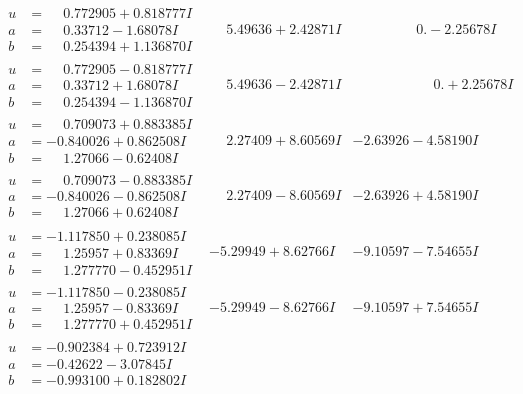 \documentclass[1p]{elsarticle_modified}
\theoremstyle{definition}
\begin{document}
$$\begin{array}{c|c|c}
\begin{aligned}
u &= \phantom{-}0.772905 + 0.818777 I \\
a &= \phantom{-}0.33712 - 1.68078 I \\
b &= \phantom{-}0.254394 + 1.136870 I\end{aligned}
 & \phantom{-}5.49636 + 2.42871 I & \phantom{-0.000000 } 0. - 2.25678 I \\ \hline\begin{aligned}
u &= \phantom{-}0.772905 - 0.818777 I \\
a &= \phantom{-}0.33712 + 1.68078 I \\
b &= \phantom{-}0.254394 - 1.136870 I\end{aligned}
 & \phantom{-}5.49636 - 2.42871 I & \phantom{-0.000000 -}0. + 2.25678 I \\ \hline\begin{aligned}
u &= \phantom{-}0.709073 + 0.883385 I \\
a &= -0.840026 + 0.862508 I \\
b &= \phantom{-}1.27066 - 0.62408 I\end{aligned}
 & \phantom{-}2.27409 + 8.60569 I & -2.63926 - 4.58190 I \\ \hline\begin{aligned}
u &= \phantom{-}0.709073 - 0.883385 I \\
a &= -0.840026 - 0.862508 I \\
b &= \phantom{-}1.27066 + 0.62408 I\end{aligned}
 & \phantom{-}2.27409 - 8.60569 I & -2.63926 + 4.58190 I \\ \hline\begin{aligned}
u &= -1.117850 + 0.238085 I \\
a &= \phantom{-}1.25957 + 0.83369 I \\
b &= \phantom{-}1.277770 - 0.452951 I\end{aligned}
 & -5.29949 + 8.62766 I & -9.10597 - 7.54655 I \\ \hline\begin{aligned}
u &= -1.117850 - 0.238085 I \\
a &= \phantom{-}1.25957 - 0.83369 I \\
b &= \phantom{-}1.277770 + 0.452951 I\end{aligned}
 & -5.29949 - 8.62766 I & -9.10597 + 7.54655 I \\ \hline\begin{aligned}
u &= -0.902384 + 0.723912 I \\
a &= -0.42622 - 3.07845 I \\
b &= -0.993100 + 0.182802 I\end{aligned}

\end{array}$$
\end{document}
